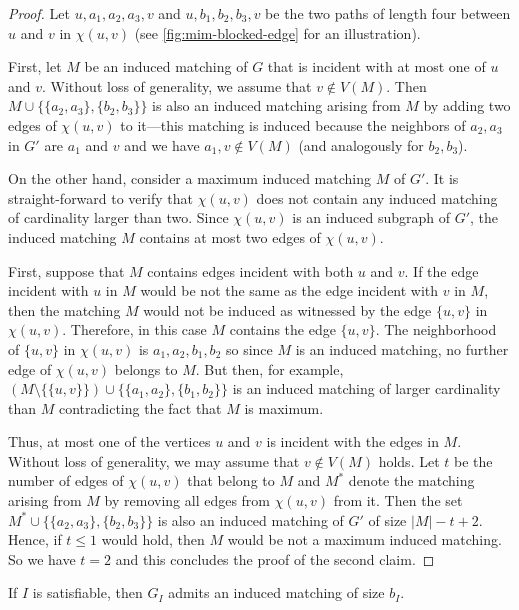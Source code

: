 \documentclass[a4paper,UKenglish,cleveref, autoref, thm-restate]{lipics-v2021}
\begin{document}
\begin{proof}
    Let $u, a_1, a_2, a_3, v$ and $u, b_1, b_2, b_3, v$ be the two paths of length four between $u$ and $v$ in $\chi(u, v)$ (see \cref{fig:mim-blocked-edge} for an illustration). 

    First, let $M$ be an induced matching of $G$ that is incident with at most one of $u$ and $v$. 
    Without loss of generality, we assume that $v\notin V(M)$. 
    Then $M \cup \{\{a_2, a_3\}, \{b_2, b_3\}\}$ is also an induced matching arising from $M$ by adding two edges of $\chi(u, v)$ to it---this matching is induced because the neighbors of $a_2, a_3$ in $G'$ are $a_1$ and $v$ and we have $a_1, v \notin V(M)$ (and analogously for $b_2, b_3$).
    
    On the other hand, consider a maximum induced matching $M$ of $G'$.
    It is straight-forward to verify that $\chi(u,v)$ does not contain any induced matching of cardinality larger than two.
    Since $\chi(u, v)$ is an induced subgraph of $G'$, the induced matching $M$ contains at most two edges of $\chi(u, v)$.
    
    First, suppose that $M$ contains edges incident with both $u$ and $v$.
    If the edge incident with $u$ in $M$ would be not the same as the edge incident with $v$ in $M$, then the matching $M$ would not be induced as witnessed by the edge $\{u,v\}$ in $\chi(u,v)$.
    Therefore, in this case $M$ contains the edge $\{u, v\}$.
    The neighborhood of $\{u,v\}$ in $\chi(u, v)$ is $a_1, a_2, b_1, b_2$ so since $M$ is an induced matching, no further edge of $\chi(u, v)$ belongs to $M$.
    But then, for example, $(M \setminus \{\{u,v\}\}) \cup \{\{a_1, a_2\}, \{b_1, b_2\}\}$ is an induced matching of larger cardinality than $M$ contradicting the fact that $M$ is maximum.
    
    Thus, at most one of the vertices $u$ and $v$ is incident with the edges in $M$.
    Without loss of generality, we may assume that $v \notin V(M)$ holds.
    Let $t$ be the number of edges of $\chi(u,v)$ that belong to $M$ and $M^*$ denote the matching arising from $M$ by removing all edges from $\chi(u, v)$ from it.
    Then the set $M^* \cup \{\{a_2, a_3\}, \{b_2, b_3\}\}$ is also an induced matching of $G'$ of size $|M| - t + 2$.
    Hence, if $t \leq 1$ would hold, then $M$ would be not a maximum induced matching.
    So we have $t = 2$ and this concludes the proof of the second claim.
\end{proof}

\begin{lemma}\label{mim::lem:sat-to-sol}
    If $I$ is satisfiable, then $G_I$ admits an induced matching of size $b_I$.
\end{lemma}
\end{document}
